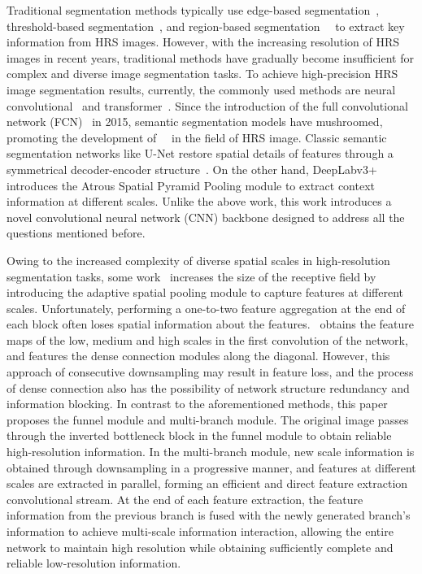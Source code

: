 \documentclass[journal]{IEEEtran}
\begin{document}
Traditional segmentation methods typically use edge-based segmentation~\cite{wanto2021combination, tian2021sobel, li2021bi}, threshold-based segmentation~\cite{rogerson2002change, lei2021remote, yang2017region}, and region-based segmentation~\cite{wang2010automatic}~\cite{zhang2015segmentation} to extract key information from HRS images. However, with the increasing resolution of HRS images in recent years, traditional methods have gradually become insufficient for complex and diverse image segmentation tasks. To achieve high-precision HRS image segmentation results, currently, the commonly used methods are neural convolutional~\cite{kampffmeyer2016semantic, ding2020lanet, fu2019dual, li2020scattnet, niu2021hybrid} and transformer~\cite{strudel2021segmenter, xie2021segformer, wang2022advancing}. 
Since the introduction of the full convolutional network (FCN)~\cite{long2015fully} in 2015, semantic segmentation models have mushroomed, promoting the development of~\cite{fu2019dual}~\cite{li2020scattnet} in the field of HRS image. Classic semantic segmentation networks like U-Net restore spatial details of features through a symmetrical decoder-encoder structure~\cite{ronneberger2015u}. On the other hand, DeepLabv3+~\cite{chen2018encoder} introduces the Atrous Spatial Pyramid Pooling module to extract context information at different scales. Unlike the above work, this work introduces a novel convolutional neural network (CNN) backbone designed to address all the questions mentioned before.

Owing to the increased complexity of diverse spatial scales in high-resolution segmentation tasks, some work~\cite{yin2020optimised,li2020novel,wang2023adaptive} increases the size of the receptive field by introducing the adaptive spatial pooling module to capture features at different scales. Unfortunately, performing a one-to-two feature aggregation at the end of each block often loses spatial information about the features.~\cite{zhang2019multi} obtains the feature maps of the low, medium and high scales in the first convolution of the network, and features the dense connection modules along the diagonal. However, this approach of consecutive downsampling may result in feature loss, and the process of dense connection also has the possibility of network structure redundancy and information blocking.
In contrast to the aforementioned methods, this paper proposes the funnel module and multi-branch module. The original image passes through the inverted bottleneck block in the funnel module to obtain reliable high-resolution information. In the multi-branch module, new scale information is obtained through downsampling in a progressive manner, and features at different scales are extracted in parallel, forming an efficient and direct feature extraction convolutional stream. At the end of each feature extraction, the feature information from the previous branch is fused with the newly generated branch's information to achieve multi-scale information interaction, allowing the entire network to maintain high resolution while obtaining sufficiently complete and reliable low-resolution information.
\end{document}
